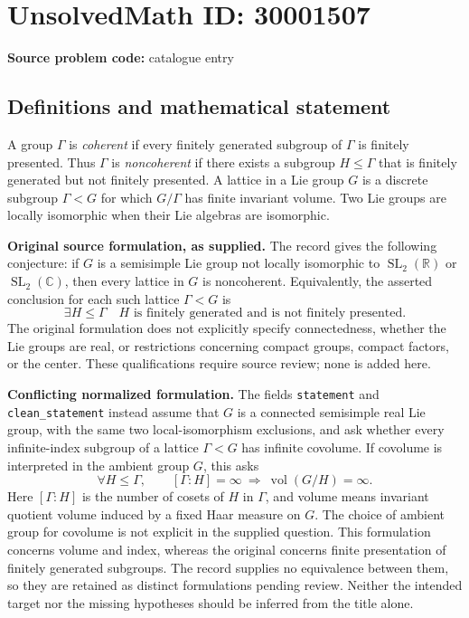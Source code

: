 \documentclass[11pt]{article}
\newcommand{\R}{\mathbb{R}}
\newcommand{\C}{\mathbb{C}}
\begin{document}
\section*{UnsolvedMath ID: 30001507}
\textbf{Source problem code:} catalogue entry
\subsection{Definitions and mathematical statement}
A group \(\Gamma\) is \emph{coherent} if every finitely generated subgroup of \(\Gamma\) is finitely presented. Thus \(\Gamma\) is \emph{noncoherent} if there exists a subgroup \(H\leq\Gamma\) that is finitely generated but not finitely presented. A lattice in a Lie group \(G\) is a discrete subgroup \(\Gamma<G\) for which \(G/\Gamma\) has finite invariant volume. Two Lie groups are locally isomorphic when their Lie algebras are isomorphic.

\textbf{Original source formulation, as supplied.} The record gives the following conjecture: if \(G\) is a semisimple Lie group not locally isomorphic to \(\operatorname{SL}_2(\R)\) or \(\operatorname{SL}_2(\C)\), then every lattice in \(G\) is noncoherent. Equivalently, the asserted conclusion for each such lattice \(\Gamma<G\) is
\[
\exists H\leq\Gamma\quad H\text{ is finitely generated and is not finitely presented}.
\]
The original formulation does not explicitly specify connectedness, whether the Lie groups are real, or restrictions concerning compact groups, compact factors, or the center. These qualifications require source review; none is added here.

\textbf{Conflicting normalized formulation.} The fields \texttt{statement} and \texttt{clean\_statement} instead assume that \(G\) is a connected semisimple real Lie group, with the same two local-isomorphism exclusions, and ask whether every infinite-index subgroup of a lattice \(\Gamma<G\) has infinite covolume. If covolume is interpreted in the ambient group \(G\), this asks
\[
\forall H\leq\Gamma,\qquad [\Gamma:H]=\infty
\ \Longrightarrow\ \operatorname{vol}(G/H)=\infty.
\]
Here \([\Gamma:H]\) is the number of cosets of \(H\) in \(\Gamma\), and volume means invariant quotient volume induced by a fixed Haar measure on \(G\). The choice of ambient group for covolume is not explicit in the supplied question. This formulation concerns volume and index, whereas the original concerns finite presentation of finitely generated subgroups. The record supplies no equivalence between them, so they are retained as distinct formulations pending review. Neither the intended target nor the missing hypotheses should be inferred from the title alone.
\end{document}
